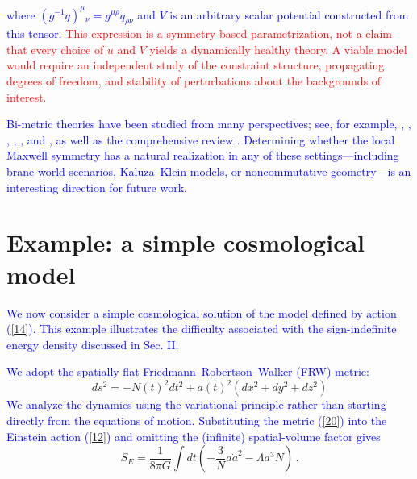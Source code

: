 \documentclass [prd,reprint,eqsecnum,nofootinbib]  {revtex4-1}
\newcommand{\corr}[1]{\textcolor{blue}{#1}}
\newcommand{\add}[1]{\textcolor{red}{#1}}
\begin{document}
\corr{where $(g^{-1}q)^\mu{}_\nu=g^{\mu\rho}q_{\rho\nu}$ and
$V$ is an arbitrary scalar potential constructed from this tensor.}
\add{This expression is a symmetry-based parametrization, not a claim
that every choice of $u$ and $V$ yields a dynamically healthy theory.
A viable model would require an independent study of the constraint
structure, propagating degrees of freedom, and stability of perturbations
about the backgrounds of interest.}




\corr{Bi-metric theories have been studied from many perspectives;
see, for example, \cite{Banados:2008fi}, \cite{Damour:2002wu},
\cite{Damour:2002ws}, \cite{ArkaniHamed:2002sp},
\cite{Blas:2005yk}, and \cite{Speziale:2010cf}, as well as the
comprehensive review \cite{Clifton:2011jh}. Determining whether the
local Maxwell symmetry has a natural realization in any of these
settings---including brane-world scenarios, Kaluza--Klein models,
or noncommutative geometry---is an interesting direction for future
work.}
\section{Example: a simple cosmological model}



\corr{We now consider a simple cosmological solution of the model
defined by action (\ref{14}). This example illustrates the
difficulty associated with the sign-indefinite energy density
discussed in Sec. II.}

\corr{We adopt the spatially flat Friedmann--Robertson--Walker (FRW)
metric:}
\begin{equation}\label{20}

    ds^2 =-N(t)^2dt^2+a(t)^2 (dx^2+dy^2+dz^2)

\end{equation}
\corr{We analyze the dynamics using the variational principle rather
than starting directly from the equations of motion. Substituting
the metric (\ref{20}) into the Einstein action (\ref{12}) and
omitting the (infinite) spatial-volume factor gives}
\begin{equation}

S_E=\frac{1}{8\pi G}\int dt \left(-\frac{3}{N}a\dot a^2-\Lambda a^3

N\right)\,.\label{21}

\end{equation}
\end{document}
